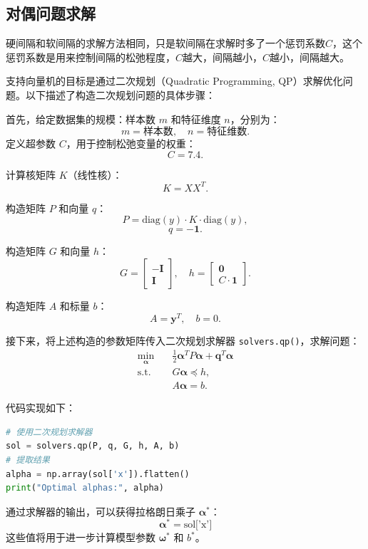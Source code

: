 \documentclass[12pt,a4paper,oneside]{article}
\begin{document}
\subsection{对偶问题求解}

\qquad 硬间隔和软间隔的求解方法相同，只是软间隔在求解时多了一个惩罚系数$C$，这个惩罚系数是用来控制间隔的松弛程度，$C$越大，间隔越小，$C$越小，间隔越大。

支持向量机的目标是通过二次规划（Quadratic Programming, QP）求解优化问题。以下描述了构造二次规划问题的具体步骤：

首先，给定数据集的规模：样本数 $m$ 和特征维度 $n$，分别为：
\[
m = \text{样本数}, \quad n = \text{特征维数}.
\]
定义超参数 $C$，用于控制松弛变量的权重：
\[
C = 7.4.
\]

计算核矩阵 $K$（线性核）：
\[
K = X X^T.
\]

构造矩阵 $P$ 和向量 $q$：
\[
P = \text{diag}(y) \cdot K \cdot \text{diag}(y),
\]
\[
q = -\pmb{1}.
\]

构造矩阵 $G$ 和向量 $h$：
\[
G = \begin{bmatrix}
    -\pmb{I} \\
    \pmb{I}
\end{bmatrix}, \quad
h = \begin{bmatrix}
    \pmb{0} \\
    C \cdot \pmb{1}
\end{bmatrix}.
\]

构造矩阵 $A$ 和标量 $b$：
\[
A = \pmb{y}^T, \quad b = 0.
\]

接下来，将上述构造的参数矩阵传入二次规划求解器 \texttt{solvers.qp()}，求解问题：
\[
\begin{aligned}
\min_{\pmb{\alpha}} \quad & \frac{1}{2} \pmb{\alpha}^T P \pmb{\alpha} + \pmb{q}^T \pmb{\alpha} \\
\text{s.t.} \quad & G\pmb{\alpha} \preceq h, \\
& A\pmb{\alpha} = b.
\end{aligned}
\]

代码实现如下：
\begin{lstlisting}[language=Python, caption=求解二次规划问题]
# 使用二次规划求解器
sol = solvers.qp(P, q, G, h, A, b)
# 提取结果
alpha = np.array(sol['x']).flatten()
print("Optimal alphas:", alpha)
\end{lstlisting}

通过求解器的输出，可以获得拉格朗日乘子 $\pmb{\alpha}^*$：
\[
\pmb{\alpha}^* = \text{sol['x']}
\]
这些值将用于进一步计算模型参数 $\pmb{\omega}^*$ 和 $b^*$。
\end{document}
